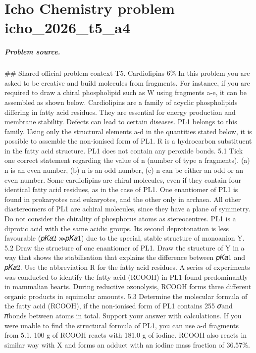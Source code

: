 
\chapter{Icho Chemistry problem icho\_2026\_t5\_a4}
\label{ch:IChO2026Problems_problem_icho_2026_t5_a4}

\paragraph{Problem source.}
\#\# Shared official problem context
T5. Cardiolipins 6\% In this problem you are asked to be creative and build molecules from fragments. For instance, if you are required to draw a chiral phospholipid such as W using fragments a-e, it can be assembled as shown below. Cardiolipins are a family of acyclic phospholipids differing in fatty acid residues. They are essential for energy production and membrane stability. Defects can lead to certain diseases. PL1 belongs to this family. Using only the structural elements a-d in the quantities stated below, it is possible to assemble the non-ionised form of PL1. R is a hydrocarbon substituent in the fatty acid structure. PL1 does not contain any peroxide bonds. 5.1 Tick one correct statement regarding the value of n (number of type a fragments). (a) n is an even number, (b) n is an odd number, (c) n can be either an odd or an even number. Some cardiolipins are chiral molecules, even if they contain four identical fatty acid residues, as in the case of PL1. One enantiomer of PL1 is found in prokaryotes and eukaryotes, and the other only in archaea. All other diastereomers of PL1 are achiral molecules, since they have a plane of symmetry. Do not consider the chirality of phosphorus atoms as stereocentres. PL1 is a diprotic acid with the same acidic groups. Its second deprotonation is less favourable (𝑝𝐾𝑎2 ≫𝑝𝐾𝑎1) due to the special, stable structure of monoanion Y. 5.2 Draw the structure of one enantiomer of PL1. Draw the structure of Y in a way that shows the stabilisation that explains the difference between 𝑝𝐾𝑎1 and 𝑝𝐾𝑎2. Use the abbreviation R for the fatty acid residues. A series of experiments was conducted to identify the fatty acid (RCOOH) in PL1 found predominantly in mammalian hearts. During reductive ozonolysis, RCOOH forms three different organic products in equimolar amounts. 5.3 Determine the molecular formula of the fatty acid (RCOOH), if the non-ionised form of PL1 contains 255 𝜎and 𝜋bonds between atoms in total. Support your answer with calculations. If you were unable to find the structural formula of PL1, you can use a-d fragments from 5.1. 100 g of RCOOH reacts with 181.0 g of iodine. RCOOH also reacts in similar way with X and forms an adduct with an iodine mass fraction of 36.57\%.

